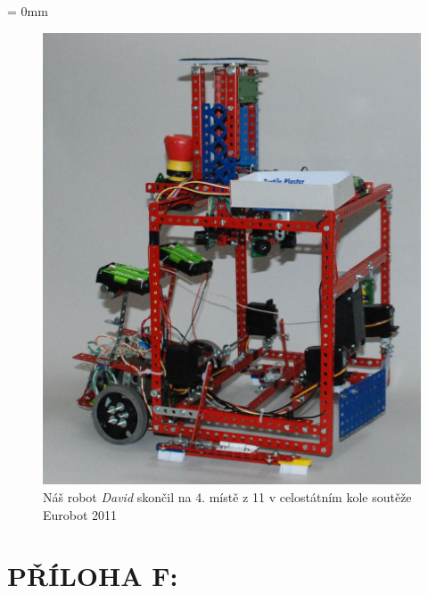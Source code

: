 \documentclass[12pt, a4paper, oneside]{article}
\newcommand{\It}{\textit}  %
\begin{document}
\pagestyle{plain}
\textheight=592pt
\textwidth=392pt
\newpage
\voffset = 0mm
\begin{figure}[H]
\begin{center}
\includegraphics[width=\textwidth]{img/use_david_robot.jpg}
\caption{Náš robot \It{David} skončil na 4. místě z 11 v celostátním kole soutěže Eurobot 2011}
\label{david}
\end{center}
\end{figure}


\newpage
\section*{PŘÍLOHA F:}
~
\listoffigures   %
\end{document}
